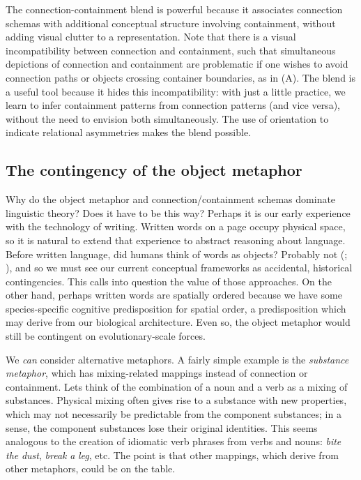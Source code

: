   The connection-containment blend is powerful because it associates connection schemas with additional conceptual structure involving containment, without adding visual clutter to a representation. Note that there is a visual incompatibility between connection and containment, such that simultaneous depictions of connection and containment are problematic if one wishes to avoid connection paths or objects crossing container boundaries, as in (A). The blend is a useful tool because it hides this incompatibility: with just a little practice, we learn to infer containment patterns from connection patterns (and vice versa), without the need to envision both simultaneously. The use of orientation to indicate relational asymmetries makes the blend possible.

\subsection{{\textbf{The contingency of the object metaphor}}}

Why do the object metaphor and connection/containment schemas dominate linguistic theory? Does it have to be this way? Perhaps it is our early experience with the technology of writing. Written words on a page occupy physical space, so it is natural to extend that experience to abstract reasoning about language. Before written language, did humans think of words as objects? Probably not (\citealt{Linell19882005}; \citealt{Ong2013}), and so we must see our current conceptual frameworks as accidental, historical contingencies. This calls into question the value of those approaches. On the other hand, perhaps written words are spatially ordered because we have some species-specific cognitive predisposition for spatial order, a predisposition which may derive from our biological architecture. Even so, the object metaphor would still be contingent on evolutionary-scale forces. 

  We \textit{can} consider alternative metaphors. A fairly simple example is the \textit{substance} \textit{metaphor}, which has mixing-related mappings instead of connection or containment. Lets think of the combination of a noun and a verb as a mixing of substances. Physical mixing often gives rise to a substance with new properties, which may not necessarily be predictable from the component substances; in a sense, the component substances lose their original identities. This seems analogous to the creation of idiomatic verb phrases from verbs and nouns: \textit{bite} \textit{the} \textit{dust}, \textit{break} \textit{a} \textit{leg}, etc. The point is that other mappings, which derive from other metaphors, could be on the table.

